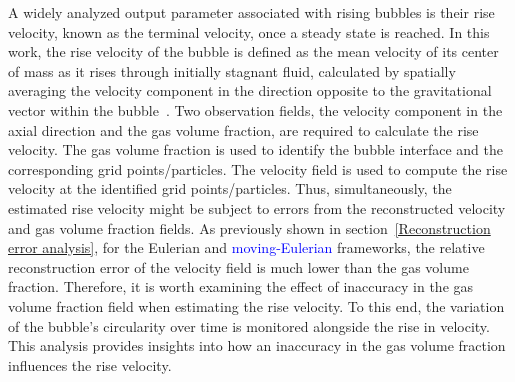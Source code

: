 \documentclass[a4paper,fleqn]{cas-sc}
\newcommand{\hl}[1]{\textcolor{blue}{#1}}
\newcommand{\hl}[1]{#1}
\begin{document}
	A widely analyzed output parameter associated with rising bubbles is their rise velocity, known as the terminal velocity, once a steady state is reached. In this work, the rise velocity of the bubble is defined as the mean velocity of its center of mass as it rises through initially stagnant fluid, calculated by spatially averaging the velocity component in the direction opposite to the gravitational vector within the bubble~\cite{Hysing2009}. Two observation fields, the velocity component in the axial direction and the gas volume fraction, are required to calculate the rise velocity. The gas volume fraction is used to identify the bubble interface and the corresponding grid points/particles. The velocity field is used to compute the rise velocity at the identified grid points/particles. Thus, simultaneously, the estimated rise velocity might be subject to errors from the reconstructed velocity and gas volume fraction fields. As previously shown in section~\ref{Reconstruction error analysis}, for the Eulerian and \hl{moving-Eulerian} frameworks, the relative reconstruction error of the velocity field is much lower than the gas volume fraction. Therefore, it is worth examining the effect of inaccuracy in the gas volume fraction field when estimating the rise velocity. To this end, the variation of the bubble's circularity over time is monitored alongside the rise in velocity. This analysis provides insights into how an inaccuracy in the gas volume fraction influences the rise velocity. 
	
\end{document}
